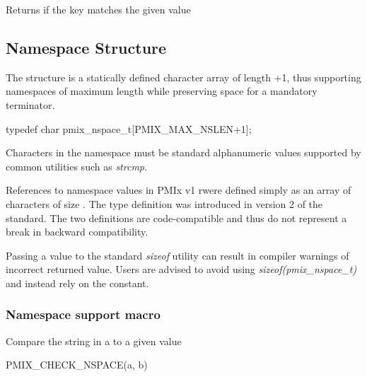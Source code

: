 \begin{arglist}
\end{arglist}

Returns  if the key matches the given value

\subsection{Namespace Structure}

The  structure is a statically defined character array of length +1, thus supporting namespaces of maximum length  while preserving space for a mandatory  terminator.

\cspecificstart
\begin{codepar}
typedef char pmix_nspace_t[PMIX_MAX_NSLEN+1];
\end{codepar}
\cspecificend

Characters in the namespace must be standard alphanumeric values supported by common utilities such as \textit{strcmp}.

\adviceuserstart
References to namespace values in \ac{PMIx} v1 rwere defined simply as an array of characters of size . The  type definition was introduced in version 2 of the standard. The two definitions are code-compatible and thus do not represent a break in backward compatibility.

Passing a  value to the standard \textit{sizeof} utility can result in compiler warnings of incorrect returned value. Users are advised to avoid using \textit{sizeof(pmix_nspace_t)} and instead rely on the  constant.
\adviceuserend

\subsubsection{Namespace support macro}

Compare the string in a  to a given value

\cspecificstart
\begin{codepar}
PMIX_CHECK_NSPACE(a, b)
\end{codepar}
\cspecificend

